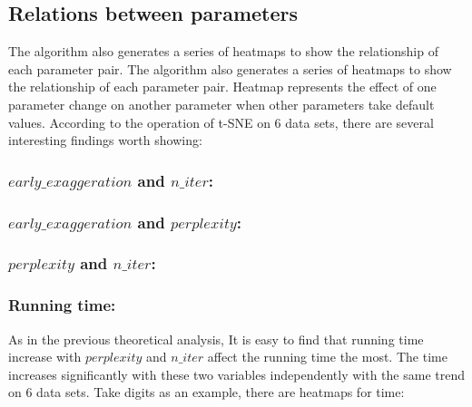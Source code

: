 \subsection{Relations between parameters}

The algorithm also generates a series of heatmaps to show the relationship of each parameter pair. The algorithm also generates a series of heatmaps to show the relationship of each parameter pair. Heatmap represents the effect of one parameter change on another parameter when other parameters take default values. According to the operation of t-SNE on 6 data sets, there are several interesting findings worth showing:

\subsubsection{$early\_exaggeration$ and $n\_iter$:}
\subsubsection{$early\_exaggeration$ and $perplexity$:}
\subsubsection{$perplexity$ and $n\_iter$:}

\subsubsection{Running time:}

As in the previous theoretical analysis,  It is easy to find that running time increase with $perplexity$ and $n\_iter$ affect the running time the most. The time increases significantly with these two variables independently with the same trend on 6 data sets. Take digits as an example, there are heatmaps for time:

